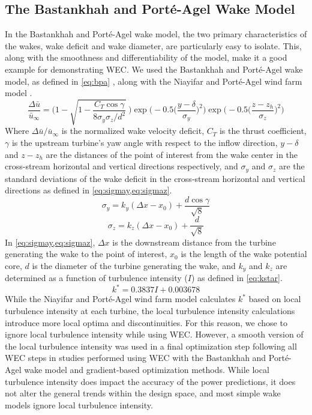 \documentclass{jpconf}
\begin{document}
\subsection{The Bastankhah and Port\'e-Agel Wake Model}
In the Bastankhah and Port\'e-Agel wake model, the two primary characteristics of the wakes, wake deficit and wake diameter, are particularly easy to isolate. This, along with the smoothness and differentiability of the model, make it a good example for demonstrating WEC. We used the Bastankhah and Port\'e-Agel wake model, as defined in \cref{eq:bpa} \cite{bastankhah2016}, along with the Niayifar and Port\'e-Agel wind farm model \cite{niayifar2016}.
%
\begin{equation}
	\frac{\Delta \bar{u}}{\bar{u}_{\infty}} = \Bigg(1-\sqrt{1-\frac{C_T \cos{\gamma}}{8 \sigma_y \sigma_z/d^2}}~\Bigg) \exp{\bigg(-0.5\Big(\frac{y-\delta}{\sigma_y}\Big)^2\bigg)}\exp{\bigg(-0.5\Big(\frac{z-z_h}{\sigma_z}\Big)^2\bigg)}
	 \label{eq:bpa}
\end{equation}
%
Where $\Delta \bar{u} / \bar{u}_{\infty}$ is the normalized wake velocity deficit, $C_T$ is the thrust coefficient, $\gamma$ is the upstream turbine's yaw angle with respect to the inflow direction, $y-\delta$ and $z-z_h$ are the distances of the point of interest from the wake center in the cross-stream horizontal and vertical directions respectively, and $\sigma_y$ and $\sigma_z$ are the standard deviations of the wake deficit in the cross-stream horizontal and vertical directions as defined in \cref{eq:sigmay,eq:sigmaz}.
%
\begin{equation}\label{eq:sigmay}
	\sigma_y = k_y (\Delta x - x_0) + \frac{d \cos{\gamma}}{\sqrt{8}}
\end{equation}
%
\begin{equation}\label{eq:sigmaz}
	\sigma_z = k_z (\Delta x - x_0) + \frac{d}{\sqrt{8}}
\end{equation}
%
In \cref{eq:sigmay,eq:sigmaz}, $\Delta x$ is the downstream distance from the turbine generating the wake to the point of interest, $x_0$ is the length of the wake potential core, $d$ is the diameter of the turbine generating the wake, and $k_y$ and $k_z$ are determined as a function of turbulence intensity ($I$) as defined in \cref{eq:kstar}\cite{niayifar2016}.
%
\begin{equation}\label{eq:kstar}
	k^* = 0.3837I + 0.003678
\end{equation}
%
While the Niayifar and Port\'e-Agel wind farm model calculates $k^*$ based on local turbulence intensity at each turbine, the local turbulence intensity calculations introduce more local optima and discontinuities. For this reason, we chose to ignore local turbulence intensity while using WEC. However, a smooth version of the local turbulence intensity was used in a final optimization step following all WEC steps in studies performed using WEC with the Bastankhah and Port\'e-Agel wake model and gradient-based optimization methods. While local turbulence intensity does impact the accuracy of the power predictions, it does not alter the general trends within the design space, and most simple wake models ignore local turbulence intensity. 
\end{document}
